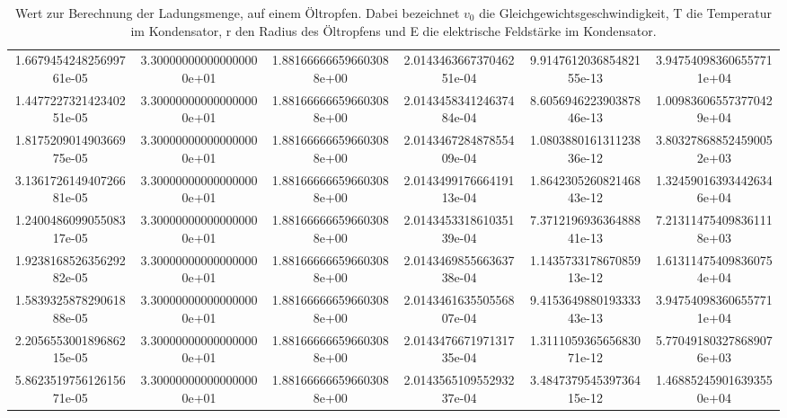 \begin{table}
{\begin{tabular}{S S[scientific-notation=fixed, fixed-exponent= 0,round-precision=0] S[round-precision=3] S[round-precision = 6]@{$\quad\qquad\pm $} S S}
    1.667945424825699761e-05 & 3.300000000000000000e+01 & 1.881666666596603088e+00 & 2.014346366737046251e-04 & 9.914761203685482155e-13 & 3.947540983606557711e+04\\
    1.447722732142340251e-05 & 3.300000000000000000e+01 & 1.881666666596603088e+00 & 2.014345834124637484e-04 & 8.605694622390387846e-13 & 1.009836065573770429e+04\\
    1.817520901490366975e-05 & 3.300000000000000000e+01 & 1.881666666596603088e+00 & 2.014346728487855409e-04 & 1.080388016131123836e-12 & 3.803278688524590052e+03\\
    3.136172614940726681e-05 & 3.300000000000000000e+01 & 1.881666666596603088e+00 & 2.014349917666419113e-04 & 1.864230526082146843e-12 & 1.324590163934426346e+04\\
    1.240048609905508317e-05 & 3.300000000000000000e+01 & 1.881666666596603088e+00 & 2.014345331861035139e-04 & 7.371219693636488841e-13 & 7.213114754098361118e+03\\
    1.923816852635629282e-05 & 3.300000000000000000e+01 & 1.881666666596603088e+00 & 2.014346985566363738e-04 & 1.143573317867085913e-12 & 1.613114754098360754e+04\\
    1.583932587829061888e-05 & 3.300000000000000000e+01 & 1.881666666596603088e+00 & 2.014346163550556807e-04 & 9.415364988019333343e-13 & 3.947540983606557711e+04\\
    2.205655300189686215e-05 & 3.300000000000000000e+01 & 1.881666666596603088e+00 & 2.014347667197131735e-04 & 1.311105936565683071e-12 & 5.770491803278689076e+03\\
    5.862351975612615671e-05 & 3.300000000000000000e+01 & 1.881666666596603088e+00 & 2.014356510955293237e-04 & 3.484737954539736415e-12 & 1.468852459016393550e+04\\
    \bottomrule
  \end{tabular}
}
  \caption{Wert zur Berechnung der Ladungsmenge, auf einem Öltropfen. Dabei
  bezeichnet \texorpdfstring{$v_0$}{math} die Gleichgewichtsgeschwindigkeit, T
  die Temperatur im Kondensator, r den Radius des Öltropfens und E die elektrische
  Feldstärke im Kondensator.}
  \label{tab:mill}
\end{table}


